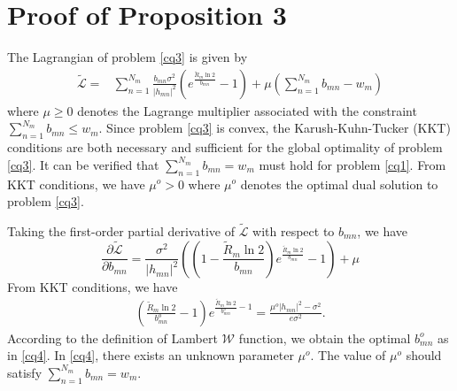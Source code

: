 \documentclass[journal]{IEEEtran}
\begin{document}
\section{Proof of Proposition 3}
The Lagrangian of problem \eqref{cq3} is given by
\begin{align}
\tilde{\mathcal{L}}=&\sum\limits_{n= 1}^{N_m} \frac{b_{mn}\sigma^2}{\left|h_{mn}\right|^2}\left(e^{\frac{\tilde{R}_m\ln2}{b_{mn}}} - 1\right)+\mu\left(\sum_{n= 1}^{N_m}b_{mn} - w_m\right)
\end{align}
where $\mu\geq 0$ denotes the Lagrange multiplier associated with the constraint $\sum_{n=1}^{N_m} b_{mn}\leq w_m$. Since problem \eqref{cq3} is convex, the Karush-Kuhn-Tucker (KKT) conditions are both necessary and 	sufficient for the global optimality of problem \eqref{cq3}. It can be verified that $\sum_{n=1}^{N_m} b_{mn}=w_m$ must hold for problem \eqref{cq1}. From KKT conditions, we have $\mu^o > 0$ where $\mu^o$ denotes the optimal dual solution to problem \eqref{cq3}.

Taking the first-order partial derivative of $\tilde{\mathcal{L}}$ with respect to $b_{mn}$, we have
\begin{equation}
\frac{\partial \tilde{\mathcal{L}}}{\partial b_{mn}}=  \frac{\sigma^2}{\left|h_{mn}\right|^2}\left(\left(1 - \frac{\tilde{R}_m\ln2}{b_{mn}}\right)e^{\frac{\tilde{R}_m\ln2}{b_{mn}}}- 1\right) + \mu
\end{equation}
From KKT conditions, we have
\begin{align}
\left(\frac{\tilde{R}_m\ln2}{b_{mn}^o} - 1\right)e^{\frac{\tilde{R}_m\ln2}{b_{mn}^o}-1}= \frac{\mu^o \left|h_{mn}\right|^2 - \sigma^2}{e\sigma^2}.
\end{align}
According to the definition of Lambert $\mathcal{W}$ function, we obtain the optimal $b_{mn}^o$ as in \eqref{cq4}. In \eqref{cq4}, there exists an unknown parameter $\mu^o$. The value of $\mu^o$ should satisfy $\sum_{n=1}^{N_m} b_{mn}=w_m$.
\end{document}
